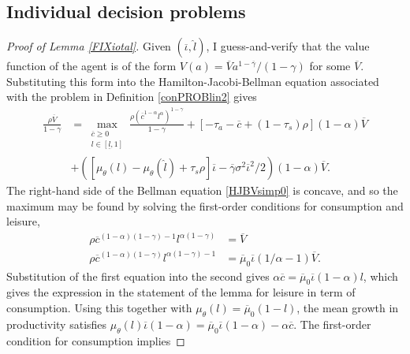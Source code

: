 \documentclass[11pt]{article}
\theoremstyle{plain}
\begin{document}
\subsection{Individual decision problems} \label{ind_decision}

\begin{proof}[Proof of Lemma \ref{FIXiotal}]
Given $(\overline{\iota}, \hat{l})$, I guess-and-verify that the value function of the agent is of the form $V(a) = \overline{V}a^{1-\overline{\gamma}}/(1-\gamma)$ for some $\overline{V}$. Substituting this form into the Hamilton-Jacobi-Bellman equation associated with the problem in Definition \ref{conPROBlin2} gives
\begin{equation}
\begin{aligned}
\frac{\rho \overline{V}}{1-\gamma} & = \max_{\substack{\overline{c} \geq 0 \\ l \in [\underline{l},1]}} \frac{\rho(\overline{c}^{1-\alpha}l^{\alpha})^{1-\gamma}}{1-\gamma} + [ - \tau_a - \overline{c} + (1-\tau_s)\rho](1-\alpha)\overline{V}
\\ & + {\left({\left[\mu_{\theta}(l) - \mu_{\theta}(\hat{l}) + \tau_s\rho\right]}\overline{\iota} - \overline{\gamma}\sigma^2\overline{\iota}^2/2\right)}(1-\alpha)\overline{V}.
\end{aligned}
\label{HJBVsimp0}
\end{equation}
The right-hand side of the Bellman equation \eqref{HJBVsimp0} is concave, and so the maximum may be found by solving the first-order conditions for consumption and leisure,
\begin{equation}
\begin{aligned}
\rho\overline{c}^{(1-\alpha)(1-\gamma)-1}l^{\alpha(1-\gamma)} & = \overline{V}
\\ \rho\overline{c}^{(1-\alpha)(1-\gamma)}l^{\alpha(1-\gamma)-1} & = \overline{\mu}_0\overline{\iota}(1/\alpha-1)\overline{V}.
\end{aligned} %
\label{FOC_ind}
\end{equation}
Substitution of the first equation into the second gives $\alpha \overline{c} = \overline{\mu}_0\overline{\iota}(1-\alpha)l$, which gives the expression in the statement of the lemma for leisure in term of consumption. Using this together with $\mu_{\theta}(l) = \overline{\mu}_0(1-l)$, the mean growth in productivity satisfies $\mu_{\theta}(l)\overline{\iota}(1-\alpha) = \overline{\mu}_0\overline{\iota}(1-\alpha) - \alpha \overline{c}$. The first-order condition for consumption implies 

\end{proof}
\end{document}

